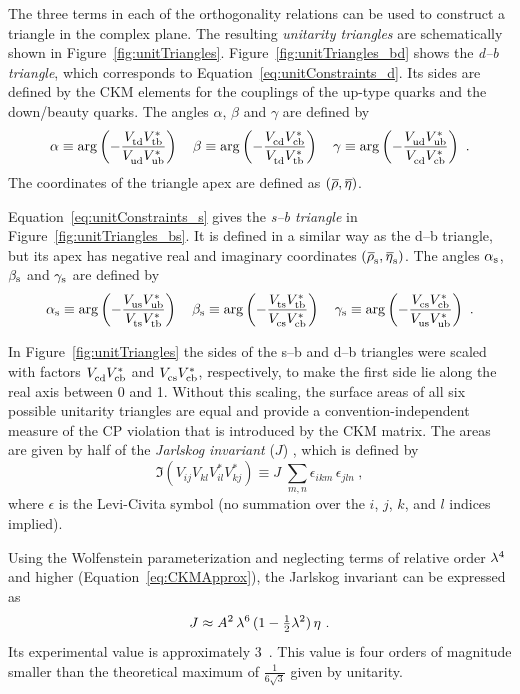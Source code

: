The three terms in each of the orthogonality relations can be used to construct a triangle in the complex plane. The resulting
\emph{unitarity triangles} are schematically shown in Figure~\ref{fig:unitTriangles}. Figure~\ref{fig:unitTriangles_bd} shows the
\emph{d--b triangle}, which corresponds to Equation~\ref{eq:unitConstraints_d}. Its sides are defined by the CKM elements for the couplings
of the up-type quarks and the down/beauty quarks. The angles $\alpha$, $\beta$ and $\gamma$ are defined by
\begin{equation}
  \label{eq:bdAnglesDef}
  \alpha \equiv \arg\left( -\frac{\Vtd\Vtb[*]}{\Vud\Vub[*]} \right)
  \quad
  \beta  \equiv \arg\left( -\frac{\Vcd\Vcb[*]}{\Vtd\Vtb[*]} \right)
  \quad
  \gamma \equiv \arg\left( -\frac{\Vud\Vub[*]}{\Vcd\Vcb[*]} \right)
  \ .
\end{equation}
The coordinates of the triangle apex are defined as $(\rhobar, \etabar)$.

Equation~\ref{eq:unitConstraints_s} gives the \emph{s--b triangle} in Figure~\ref{fig:unitTriangles_bs}. It is defined in a
similar way as the d--b triangle, but its apex has negative real and imaginary coordinates $(\rhosbar, \etasbar)$. The angles $\alpha_\text{s}$, $\beta_\text{s}$
and $\gamma_\text{s}$ are defined by
\begin{equation}
  \label{eq:bsAnglesDef}
  \as \equiv \arg\left( -\frac{\Vus\Vub[*]}{\Vts\Vtb[*]} \right)
  \quad
  \bs \equiv \arg\left( -\frac{\Vts\Vtb[*]}{\Vcs\Vcb[*]} \right)
  \quad
  \gs \equiv \arg\left( -\frac{\Vcs\Vcb[*]}{\Vus\Vub[*]} \right)
  \ .
\end{equation}

In Figure~\ref{fig:unitTriangles} the sides of the s--b and d--b triangles were scaled with factors $\Vcd\Vcb[*]$ and $\Vcs\Vcb[*]$,
respectively, to make the first side lie along the real axis between 0 and 1. Without this scaling, the surface areas of all six possible
unitarity triangles are equal and provide a convention-independent measure of the CP violation that is introduced by the CKM matrix. The
areas are given by half of the \emph{Jarlskog invariant} ($J$) \cite{Jarlskog:1985ht}, which is defined by
\begin{equation}
  \Im( V^{\phantom{*}}_{ij} V^{\phantom{*}}_{kl} V^{*}_{il} V^{*}_{kj} ) \equiv J\; \sum_{m,n} \epsilon_{ikm}\,\epsilon_{jln}
  \ ,
\end{equation}
where $\epsilon$ is the Levi-Civita symbol (no summation over the $i$, $j$, $k$, and $l$ indices implied).

Using the Wolfenstein parameterization and neglecting terms of relative order $\lambda^4$ and higher (Equation~\ref{eq:CKMApprox}), the
Jarlskog invariant can be expressed as
\begin{equation}
  J \approx A^2\, \lambda^6\, (1-\tfrac{1}{2}\lambda^2)\, \eta
  \ .
\end{equation}
Its experimental value is approximately 3~\cite{Charles:2004jd,Bona:2005vz}. This value is four orders of magnitude smaller
than the theoretical maximum of $\frac{\text{1}}{\text{6}\sqrt{\text{3}}}$ given by unitarity.

